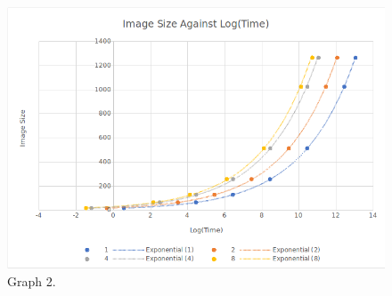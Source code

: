 \documentclass{article}
\begin{document}
\begin{figure}[H]
\centering
\includegraphics[width=15cm]{ImvsLog(Time)(BeforePow).png}
\caption{Graph 2.}
\end{figure}

\newpage

\end{document}
